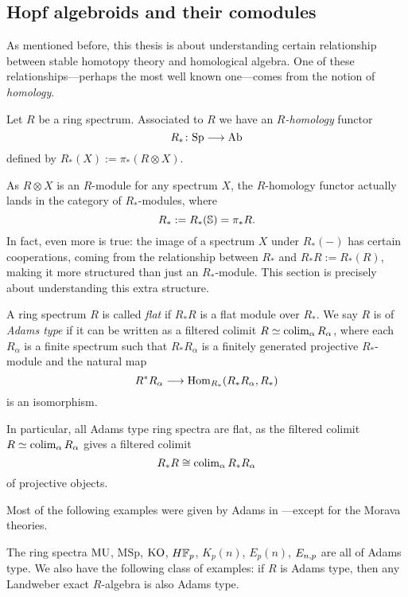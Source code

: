 

\subsection{Hopf algebroids and their comodules}
\label{ch0:ssec:hopf-algebroids-and-their-comodules}

As mentioned before, this thesis is about understanding certain relationship between stable homotopy theory and homological algebra. One of these relationships---perhaps the most well known one---comes from the notion of \emph{homology}. 

\begin{definition}
    Let $R$ be a ring spectrum. Associated to $R$ we have an \emph{$R$-homology} functor 
    \[R_* \: \Sp \to \Ab\]
    defined by $R_*(X):= \pi_*(R\otimes X)$. 
\end{definition}

As $R\otimes X$ is an $R$-module for any spectrum $X$, the $R$-homology functor actually lands in the category of $R_*$-modules, where 
\[R_*:= R_*(\S) = \pi_* R.\] 
In fact, even more is true: the image of a spectrum $X$ under $R_*(-)$ has certain cooperations, coming from the relationship between $R_*$ and $R_*R:= R_*(R)$, making it more structured than just an $R_*$-module. This section is precisely about understanding this extra structure. 

\begin{definition}
    \label{ch0:def:flat-and-adams-type-ring}
    A ring spectrum $R$ is called \emph{flat} if $R_*R$ is a flat module over $R_*$. We say $R$ is of \emph{Adams type} if it can be written as a filtered colimit $R\simeq \colim_\alpha R_\alpha$, where each $R_\alpha$ is a finite spectrum such that $R_*R_\alpha$ is a finitely generated projective $R_*$-module and the natural map 
    \[R^*R_\alpha \longrightarrow \Hom_{R_*}(R_*R_\alpha, R_*)\] 
    is an isomorphism.
\end{definition}

In particular, all Adams type ring spectra are flat, as the filtered colimit $R\simeq \colim_\alpha R_\alpha$ gives a filtered colimit 
\[R_*R\cong \colim_\alpha R_*R_\alpha\] 
of projective objects. 

Most of the following examples were given by Adams in \cite[III.13.4]{adams_74}---except for the Morava theories.

\begin{example}
    \label{ch0:ex:adams-type-ring-spectra}
    The ring spectra $\MU$, $\mathrm{MSp}$, $\KO$, $H\F_p$, $K_p(n)$, $E_p(n)$, $E\np$ are all of Adams type. We also have the following class of examples: if $R$ is Adams type, then any Landweber exact $R$-algebra is also Adams type. 
\end{example}

